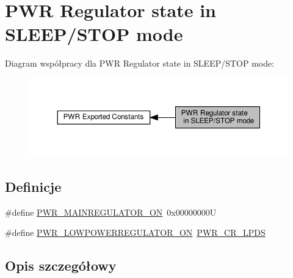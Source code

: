 \hypertarget{group___p_w_r___regulator__state__in___s_t_o_p__mode}{}\section{P\+WR Regulator state in S\+L\+E\+E\+P/\+S\+T\+OP mode}
\label{group___p_w_r___regulator__state__in___s_t_o_p__mode}
Diagram współpracy dla P\+WR Regulator state in S\+L\+E\+E\+P/\+S\+T\+OP mode\+:\nopagebreak
\begin{figure}[H]
\begin{center}
\leavevmode
\includegraphics[width=350pt]{group___p_w_r___regulator__state__in___s_t_o_p__mode}
\end{center}
\end{figure}
\subsection*{Definicje}
\begin{DoxyCompactItemize}
\item 
\#define \hyperlink{group___p_w_r___regulator__state__in___s_t_o_p__mode_ga1d5b4e1482184286e28c16162f530039}{P\+W\+R\+\_\+\+M\+A\+I\+N\+R\+E\+G\+U\+L\+A\+T\+O\+R\+\_\+\+ON}~0x00000000U
\item 
\#define \hyperlink{group___p_w_r___regulator__state__in___s_t_o_p__mode_gab9922a15f8414818d736d5e7fcace963}{P\+W\+R\+\_\+\+L\+O\+W\+P\+O\+W\+E\+R\+R\+E\+G\+U\+L\+A\+T\+O\+R\+\_\+\+ON}~\hyperlink{group___peripheral___registers___bits___definition_ga3aeb8d6f2539b0a3a4b851aeba0eea66}{P\+W\+R\+\_\+\+C\+R\+\_\+\+L\+P\+DS}
\end{DoxyCompactItemize}


\subsection{Opis szczegółowy}


